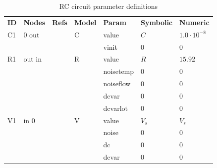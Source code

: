 \begin{table}[h]
\centering
\begin{tabular}[c]{lllllll}
\textbf{ID} & \textbf{Nodes} & \textbf{Refs} & \textbf{Model} & \textbf{Param} & \textbf{Symbolic} & \textbf{Numeric} \\ 
\rowcolor{myyellow}
\small{C1} &\small{0 out } & &\small{C} &\small{value} &$C$ &$1.0 \cdot 10^{-8}$ \\ 
 & & & &\small{vinit} &$0$ &$0$ \\ 
\rowcolor{myyellow}
\small{R1} &\small{out in } & &\small{R} &\small{value} &$R$ &$15.92$ \\ 
 & & & &\small{noisetemp} &$0$ &$0$ \\ 
\rowcolor{myyellow}
 & & & &\small{noiseflow} &$0$ &$0$ \\ 
 & & & &\small{dcvar} &$0$ &$0$ \\ 
\rowcolor{myyellow}
 & & & &\small{dcvarlot} &$0$ &$0$ \\ 
\small{V1} &\small{in 0 } & &\small{V} &\small{value} &$V_{s}$ &$V_{s}$ \\ 
\rowcolor{myyellow}
 & & & &\small{noise} &$0$ &$0$ \\ 
 & & & &\small{dc} &$0$ &$0$ \\ 
\rowcolor{myyellow}
 & & & &\small{dcvar} &$0$ &$0$ \\ 
\end{tabular}
\caption{RC circuit parameter definitions}
\end{table}

